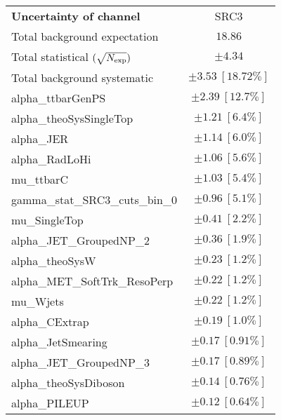 
\begin{table}
\begin{center}
\setlength{\tabcolsep}{0.0pc}
\begin{tabular*}{\textwidth}{@{\extracolsep{\fill}}lc}
\noalign{\smallskip}\hline\noalign{\smallskip}
{\bf Uncertainty of channel}                                    & SRC3            \\
\noalign{\smallskip}\hline\noalign{\smallskip}
Total background expectation             &  $18.86$       \\
\noalign{\smallskip}\hline\noalign{\smallskip}
Total statistical $(\sqrt{N_{\rm exp}})$              & $\pm 4.34$       \\
Total background systematic               & $\pm 3.53\ [18.72\%] $             \\
\noalign{\smallskip}\hline\noalign{\smallskip}
\noalign{\smallskip}\hline\noalign{\smallskip}
alpha\_ttbarGenPS         & $\pm 2.39\ [12.7\%] $       \\
alpha\_theoSysSingleTop         & $\pm 1.21\ [6.4\%] $       \\
alpha\_JER         & $\pm 1.14\ [6.0\%] $       \\
alpha\_RadLoHi         & $\pm 1.06\ [5.6\%] $       \\
mu\_ttbarC         & $\pm 1.03\ [5.4\%] $       \\
gamma\_stat\_SRC3\_cuts\_bin\_0         & $\pm 0.96\ [5.1\%] $       \\
mu\_SingleTop         & $\pm 0.41\ [2.2\%] $       \\
alpha\_JET\_GroupedNP\_2         & $\pm 0.36\ [1.9\%] $       \\
alpha\_theoSysW         & $\pm 0.23\ [1.2\%] $       \\
alpha\_MET\_SoftTrk\_ResoPerp         & $\pm 0.22\ [1.2\%] $       \\
mu\_Wjets         & $\pm 0.22\ [1.2\%] $       \\
alpha\_CExtrap         & $\pm 0.19\ [1.0\%] $       \\
alpha\_JetSmearing         & $\pm 0.17\ [0.91\%] $       \\
alpha\_JET\_GroupedNP\_3         & $\pm 0.17\ [0.89\%] $       \\
alpha\_theoSysDiboson         & $\pm 0.14\ [0.76\%] $       \\
alpha\_PILEUP         & $\pm 0.12\ [0.64\%] $       \\

\end{tabular*}
\end{center}
\end{table}

